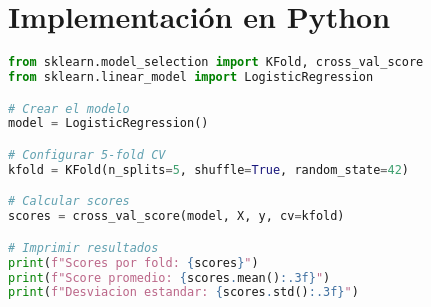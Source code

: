 \documentclass[12pt]{article}
\begin{document}
\section{Implementación en Python}
\begin{lstlisting}[language=Python]
from sklearn.model_selection import KFold, cross_val_score
from sklearn.linear_model import LogisticRegression

# Crear el modelo
model = LogisticRegression()

# Configurar 5-fold CV
kfold = KFold(n_splits=5, shuffle=True, random_state=42)

# Calcular scores
scores = cross_val_score(model, X, y, cv=kfold)

# Imprimir resultados
print(f"Scores por fold: {scores}")
print(f"Score promedio: {scores.mean():.3f}")
print(f"Desviacion estandar: {scores.std():.3f}")
\end{lstlisting}
\end{document}
